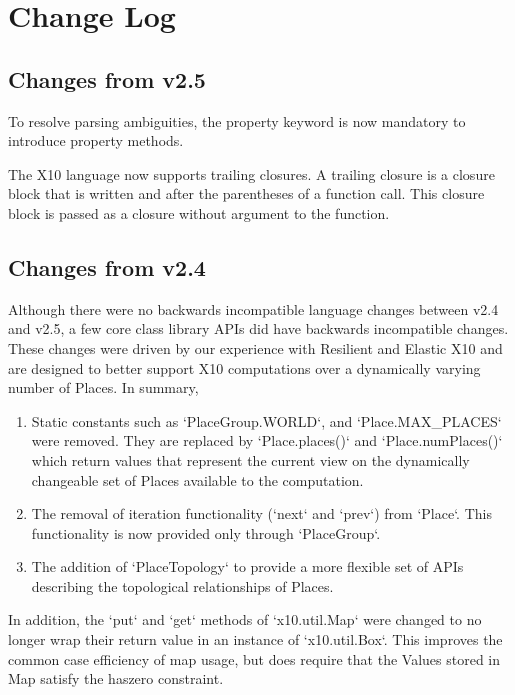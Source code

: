 \chapter{Change Log}

\section{Changes from \Xten{} v2.5}

To resolve parsing ambiguities, the property keyword is now mandatory
to introduce property methods.

The X10 language now supports trailing closures. A trailing closure is
a closure block that is written and after the parentheses of a
function call. This closure block is passed as a closure without
argument to the function. 

\section{Changes from \Xten{} v2.4}
Although there were no backwards incompatible language changes between
\Xten{} v2.4 and \Xten{} v2.5, a few core class library APIs did 
have backwards incompatible changes.  These changes were driven by 
our experience with Resilient and Elastic X10 and are designed to
better support X10 computations over a dynamically varying number of
Places.  In summary,
\begin{enumerate}
\item Static constants such as \xcd`PlaceGroup.WORLD`,
    and \xcd`Place.MAX\_PLACES` were removed. They are replaced by
    \xcd`Place.places()` and \xcd`Place.numPlaces()` which return
    values that represent the current view on the dynamically
    changeable set of Places available to the computation.
\item The removal of iteration functionality (\xcd`next` and
  \xcd`prev`) from \xcd`Place`. This functionality is now provided
  only through \xcd`PlaceGroup`. 
\item The addition of \xcd`PlaceTopology` to provide a more flexible
  set of APIs describing the topological relationships of Places.
\end{enumerate}

In addition, the \xcd`put` and \xcd`get` methods of \xcd`x10.util.Map` 
were changed to no longer wrap their return value in an instance of
\xcd`x10.util.Box`. This improves the common case efficiency of map
usage, but does require that the Values stored in Map satisfy the
haszero constraint. 


